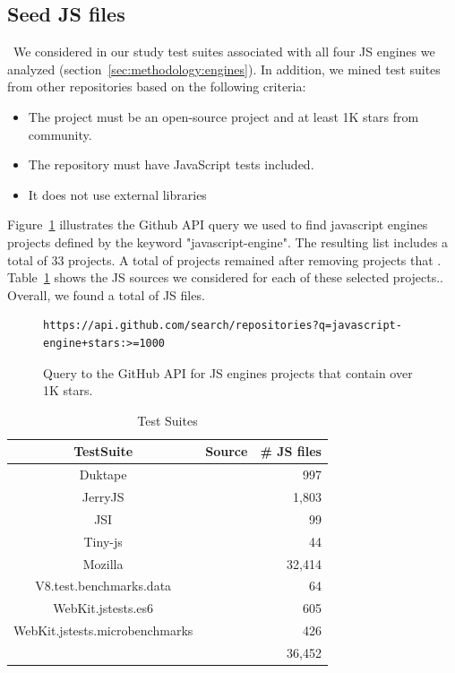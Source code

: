 \documentclass[10pt,conference,anonymous]{IEEEtran}
\begin{document}
\subsection{Seed JS files}~We considered in our study test suites
associated with all four JS engines we analyzed
(section~\ref{sec:methodology:engines}). In addition, we mined test
suites from other repositories based on the following criteria:
\begin{itemize}
  \item The project must be an open-source project and at least 1K stars from community.
  \item The repository must have JavaScript tests included.
  \item It does not use external libraries 
\end{itemize}

Figure~\ref{fig:query} illustrates the Github API query we
used to find javascript engines projects defined by the keyword "javascript-engine". 
The resulting list includes a total of 33 projects.
A total of   projects remained after
removing projects that . Table~\ref{tab:test-suites} shows
the JS sources we considered for each of these selected
projects.. Overall, we found a total of \totfiles{} JS
files.

\begin{figure}[h]
  \centering
  \begin{lstlisting}
https://api.github.com/search/repositories?q=javascript-engine+stars:>=1000
  \end{lstlisting}
  \caption{\label{fig:query}
  Query to the GitHub API for JS engines projects that contain over 1K stars.
  }
\end{figure}


\begin{table}[t]
  \centering
  \caption{\label{tab:test-suites}Test Suites}
  \begin{tabular}{ccr}
    \toprule
    TestSuite & Source & \# JS files \\
    \midrule
    Duktape & \cite{duktape} & 997 \\
    JerryJS & \cite{jerryscript} & 1,803 \\
    JSI & \cite{jsi} & 99 \\
    Tiny-js & \cite{tinyjs} & 44 \\
    Mozilla & \Fix{??} & 32,414 \\
    V8.test.benchmarks.data & \Fix{??} & 64 \\
    WebKit.jstests.es6 & \Fix{??} & 605 \\
    WebKit.jstests.microbenchmarks & \Fix{??} & 426 \\
    \midrule
     &  & 36,452 \\
   \bottomrule     
  \end{tabular}
\end{table}
\end{document}
